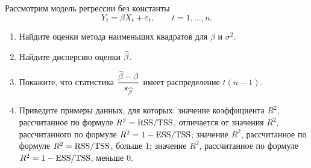 
Рассмотрим модель регрессии без константы
\[
  Y_t = \beta X_t + \varepsilon_t, \qquad t = 1,\dots,n .
\]
\begin{enumerate}[label=\asbuk*), leftmargin=2.2em, itemsep=3pt]
  \item Найдите оценки метода наименьших квадратов для $\beta$ и $\sigma^2$.
  \item Найдите дисперсию оценки $\widehat{\beta}$.
  \item Покажите, что статистика $\dfrac{\widehat{\beta} - \beta}{s_{\widehat{\beta}}}$ имеет
        распределение $t(n-1)$.
  \item Приведите примеры данных, для которых: значение коэффициента $R^2$,
        рассчитанное по формуле $R^2 = \mathrm{RSS}/\mathrm{TSS}$, отличается от значения $R^2$,
        рассчитанного по формуле $R^2 = 1 - \mathrm{ESS}/\mathrm{TSS}$; значение $R^2$,
        рассчитанное по формуле $R^2 = \mathrm{RSS}/\mathrm{TSS}$, больше 1; значение $R^2$,
        рассчитанное по формуле $R^2 = 1 - \mathrm{ESS}/\mathrm{TSS}$, меньше 0.
\end{enumerate}

